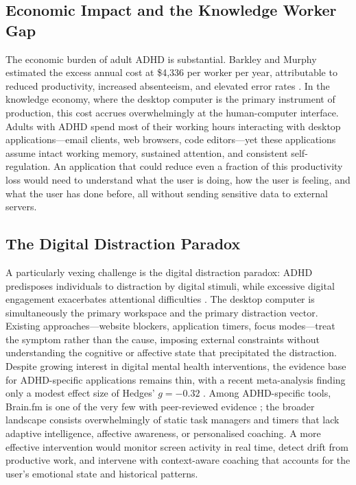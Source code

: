 \subsection{Economic Impact and the Knowledge Worker Gap}
\label{subsec:economic-impact}

The economic burden of adult ADHD is substantial. Barkley and Murphy estimated the excess annual cost at \$4,336 per worker per year, attributable to reduced productivity, increased absenteeism, and elevated error rates \cite{barkley2010}. In the knowledge economy, where the desktop computer is the primary instrument of production, this cost accrues overwhelmingly at the human-computer interface. Adults with ADHD spend most of their working hours interacting with desktop applications---email clients, web browsers, code editors---yet these applications assume intact working memory, sustained attention, and consistent self-regulation. An application that could reduce even a fraction of this productivity loss would need to understand what the user is doing, how the user is feeling, and what the user has done before, all without sending sensitive data to external servers.

\subsection{The Digital Distraction Paradox}
\label{subsec:digital-distraction}

A particularly vexing challenge is the digital distraction paradox: ADHD predisposes individuals to distraction by digital stimuli, while excessive digital engagement exacerbates attentional difficulties \cite{thorell2022, dontre2021}. The desktop computer is simultaneously the primary workspace and the primary distraction vector. Existing approaches---website blockers, application timers, focus modes---treat the symptom rather than the cause, imposing external constraints without understanding the cognitive or affective state that precipitated the distraction. Despite growing interest in digital mental health interventions, the evidence base for ADHD-specific applications remains thin, with a recent meta-analysis finding only a modest effect size of Hedges' $g = -0.32$ \cite{garciaperal2025}. Among ADHD-specific tools, Brain.fm is one of the very few with peer-reviewed evidence \cite{woods2024}; the broader landscape consists overwhelmingly of static task managers and timers that lack adaptive intelligence, affective awareness, or personalised coaching. A more effective intervention would monitor screen activity in real time, detect drift from productive work, and intervene with context-aware coaching that accounts for the user's emotional state and historical patterns.

